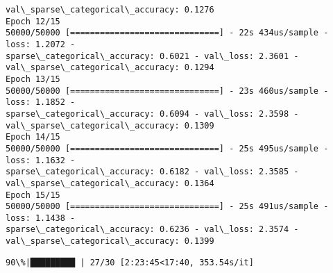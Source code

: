\documentclass[11pt]{article}
\begin{document}
\begin{Verbatim}[commandchars=\\\{\}]
val\_sparse\_categorical\_accuracy: 0.1276
Epoch 12/15
50000/50000 [==============================] - 22s 434us/sample - loss: 1.2072 -
sparse\_categorical\_accuracy: 0.6021 - val\_loss: 2.3601 -
val\_sparse\_categorical\_accuracy: 0.1294
Epoch 13/15
50000/50000 [==============================] - 23s 460us/sample - loss: 1.1852 -
sparse\_categorical\_accuracy: 0.6094 - val\_loss: 2.3598 -
val\_sparse\_categorical\_accuracy: 0.1309
Epoch 14/15
50000/50000 [==============================] - 25s 495us/sample - loss: 1.1632 -
sparse\_categorical\_accuracy: 0.6182 - val\_loss: 2.3585 -
val\_sparse\_categorical\_accuracy: 0.1364
Epoch 15/15
50000/50000 [==============================] - 25s 491us/sample - loss: 1.1438 -
sparse\_categorical\_accuracy: 0.6236 - val\_loss: 2.3574 -
val\_sparse\_categorical\_accuracy: 0.1399
    \end{Verbatim}

    \begin{Verbatim}[commandchars=\\\{\}]
 90\%|█████████ | 27/30 [2:23:45<17:40, 353.54s/it]
    \end{Verbatim}
\end{document}
